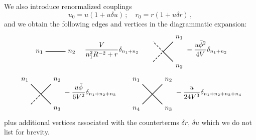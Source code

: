 \documentclass[11pt,a4paper]{article}
\begin{document}
We also introduce renormalized couplings
\begin{equation}
    u_0 = u(1 + u\delta u)\,;\quad r_0 = r(1 + u \delta r)\,,
\end{equation}
and we obtain the following edges and vertices in the diagrammatic expansion:
\begin{displaymath}
\begin{tikzpicture}[scale=0.5, baseline=(current bounding box.center)]
    \draw[thick] (-1, 0) -- (1, 0);
    \node[left] at (-1, 0) {$n_1$};
    \node[right] at (1, 0) {$n_2$};
\end{tikzpicture}
    \quad
    \frac{V}{n_1^2R^{-2} + r}\delta_{n_1 + n_2}
\quad\quad
\begin{tikzpicture}[scale=0.5, baseline=(current bounding box.center)]
    \draw[densely dashed, thick] (-1, -1) -- (0, 0) -- (-1, 1);
    \draw[thick] (+1, -1) -- (0, 0) -- (+1, 1);
    \node[above right] at (1, 1) {$n_1$};
    \node[below right] at (1, -1) {$n_2$};
\end{tikzpicture}
    -\frac{u\bar{\phi}^2}{4V}\delta_{n_1 + n_2}
\end{displaymath}
\begin{displaymath}
\begin{tikzpicture}[scale=0.5, baseline=(current bounding box.center)]
    \draw[densely dashed, thick] (-1, -1) -- (0, 0);
    \draw[thick] (0, 0) -- (-1, 1);
    \draw[thick] (+1, -1) -- (0, 0) -- (+1, 1);
    \node[above left] at (-1, 1) {$n_1$};
    \node[above right] at (1, 1) {$n_2$};
    \node[below right] at (1, -1) {$n_3$};
\end{tikzpicture}
    -\frac{u\bar{\phi}}{6V^2}\delta_{n_1 + n_2 + n_3}
\quad\quad
\begin{tikzpicture}[scale=0.5, baseline=(current bounding box.center)]
    \draw[thick] (-1, -1) -- (1, 1);
    \draw[thick] (-1, 1) -- ( 1, -1);
    \node[above left] at (-1, 1) {$n_1$};
    \node[above right] at (1, 1) {$n_2$};
    \node[below right] at (1, -1) {$n_3$};
    \node[below left] at (-1, -1) {$n_4$};
\end{tikzpicture}
    -\frac{u}{24V^3}\delta_{n_1 + n_2 + n_3 + n_4}
\end{displaymath}
plus additional vertices associated with the counterterms $\delta r$, $\delta
u$ which we do not list for brevity.
\end{document}
